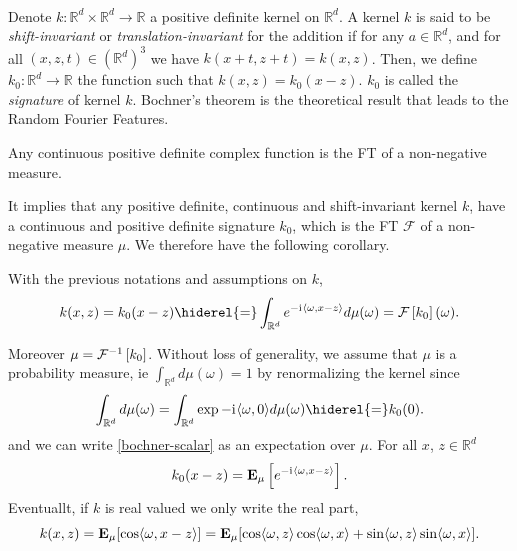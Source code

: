 \paragraph{}
Denote $k: \mathbb{R}^d \times \mathbb{R}^d \to \mathbb{R}$ a positive
definite kernel on $\mathbb{R}^d$. A kernel $k$ is said to be
\emph{shift-invariant} or \emph{translation-invariant} for the addition if for
any $a \in \mathbb{R}^d$, and for all $(x,z,t) \in \left(\mathbb{R}^d\right)^3$
we have $k(x+t,z+t) = k(x,z)$.  Then, we define $k_0: \mathbb{R}^d \to
\mathbb{R}$ the function such that $k(x,z)= k_0(x-z)$. $k_0$ is called the
\emph{signature} of kernel $k$. Bochner's theorem \citep{folland1994course} is
the theoretical result that leads to the Random Fourier Features.
\begin{theorem}\label{th:bochner-scalar}
    Any continuous positive definite complex function is the \acl{FT} of a
    non-negative measure.
\end{theorem}
It implies that any positive definite, continuous and shift-invariant kernel
$k$, have a continuous and positive definite signature $k_0$, which is the
\acl{FT} $\mathcal{F}$ of a non-negative measure $\mu$. We therefore have the
following corollary.
\begin{corollary}\label{c:bochner-app}
    With the previous notations and assumptions on $k$,
    \begin{dmath}\label{bochner-scalar}
        k(x,z)=k_0(x-z) \hiderel{=} \int_{\mathbb{R}^d} e^{-\iu \inner{\omega,x
        - z}} d\mu(\omega)
        =\FT{k_0}(\omega).
    \end{dmath}
\end{corollary}
Moreover $\mu = \mathcal{F}^{-1}\left[k_0\right]$.  Without loss of generality, we assume that $\mu$
is a probability measure, \acs{ie} $\int_{\mathbb{R}^d} d\mu(\omega)=1$ by
renormalizing the kernel since
\begin{dmath*}
    \int_{\mathbb{R}^d}d\mu(\omega)= \int_{\mathbb{R}^d}\exp{-\iu
    \inner{\omega, 0}}d\mu(\omega)\hiderel{=}k_0(0). 
\end{dmath*}
and we can write \cref{bochner-scalar} as an expectation over $\mu$. For all
$x$,
$z\in\mathbb{R}^d$
\begin{dmath*}
    k_0(x-z) = \expectation_{\mu}\left[e^{-\iu \inner{\omega,x - z}}\right].
\end{dmath*}
Eventuallt, if $k$ is real valued we only write the real part, 
\begin{dmath*}
    k(x,z) = \expectation_{\mu}[\cos \inner{\omega,x - z}] =
    \expectation_{\mu}[ \cos \inner{\omega,z} \cos \inner{\omega,x} + \sin
    \inner{\omega,z} \sin \inner{\omega,x}].
\end{dmath*}
